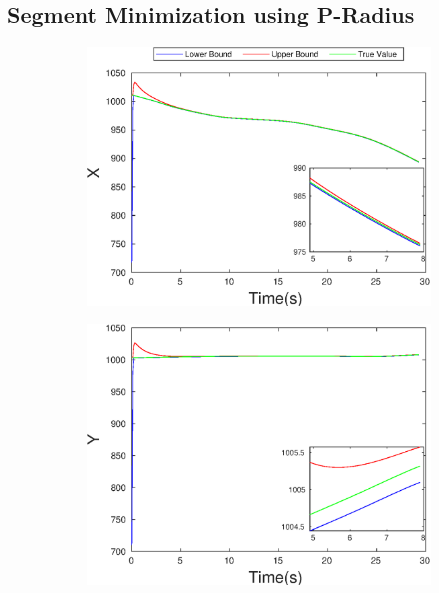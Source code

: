 \subsection{Segment Minimization using P-Radius}
\FloatBarrier
\begin{figure}[h]
\begin{subfigure}{.5\linewidth}
\centering
\includegraphics[width=\linewidth]{figures/Prad/s3cvpradX}
\end{subfigure}
\begin{subfigure}{.5\linewidth}
\centering
\includegraphics[width=\linewidth]{figures/Prad/s3cvpradY}
\end{subfigure}
\begin{subfigure}{.5\linewidth}

\end{subfigure}
\end{figure}
